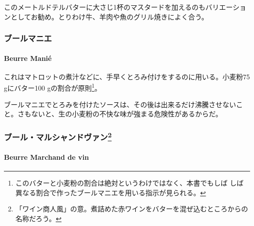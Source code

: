 \begin{recette}
このメートルドテルバターに大さじ1杯のマスタードを加えるのもバリエーショ
ンとしてお勧め。とりわけ牛、羊肉や魚のグリル焼きによく合う。

\maeaki

\hypertarget{ux30d6ux30fcux30ebux30deux30cbux30a8}{%
\subsubsection{ブールマニエ}\label{ux30d6ux30fcux30ebux30deux30cbux30a8}}

\hypertarget{beurre-manie}{%
\paragraph{Beurre Manié}\label{beurre-manie}}


これはマトロットの煮汁などに、手早くとろみ付けをするのに用いる。小麦粉75
gにバター100 gの割合が原則\footnote{このバターと小麦粉の割合は絶対というわけではなく、本書でもしば
  しば異なる割合で作ったブールマニエを用いる指示が見られる。}。

ブールマニエでとろみを付けたソースは、その後は出来るだけ沸騰させないこ
と。さもないと、生の小麦粉の不快な味が強まる危険性があるからだ。

\maeaki

\hypertarget{ux30d6ux30fcux30ebux30deux30ebux30b7ux30e3ux30f3ux30c9ux30f4ux30a1ux30f330}{%
\subsubsection[ブール・マルシャンドヴァン]{\texorpdfstring{ブール・マルシャンドヴァン\footnote{「ワイン商人風」の意。煮詰めた赤ワインをバターを混ぜ込むところからの名称だろう。}}{ブール・マルシャンドヴァン}}\label{ux30d6ux30fcux30ebux30deux30ebux30b7ux30e3ux30f3ux30c9ux30f4ux30a1ux30f330}}

\hypertarget{beurre-marchand-de-vin}{%
\paragraph{Beurre Marchand de vin}\label{beurre-marchand-de-vin}}



\end{recette}
